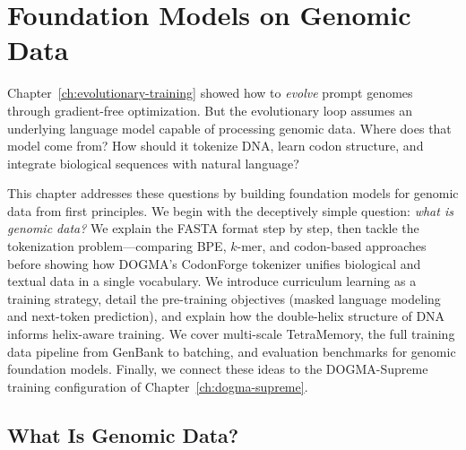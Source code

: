 
\chapter{Foundation Models on Genomic Data}
\label{ch:genomic-foundation-models}


\noindent
Chapter~\ref{ch:evolutionary-training} showed how to \emph{evolve} prompt genomes through gradient-free optimization. But the evolutionary loop assumes an underlying language model capable of processing genomic data. Where does that model come from? How should it tokenize DNA, learn codon structure, and integrate biological sequences with natural language?

This chapter addresses these questions by building foundation models for genomic data from first principles. We begin with the deceptively simple question: \emph{what is genomic data?} We explain the FASTA format step by step, then tackle the tokenization problem---comparing BPE, $k$-mer, and codon-based approaches before showing how DOGMA's CodonForge tokenizer unifies biological and textual data in a single vocabulary. We introduce curriculum learning as a training strategy, detail the pre-training objectives (masked language modeling and next-token prediction), and explain how the double-helix structure of DNA informs helix-aware training. We cover multi-scale TetraMemory, the full training data pipeline from GenBank to batching, and evaluation benchmarks for genomic foundation models. Finally, we connect these ideas to the DOGMA-Supreme training configuration of Chapter~\ref{ch:dogma-supreme}.

\section{What Is Genomic Data?}
\label{sec:genomic-data}

